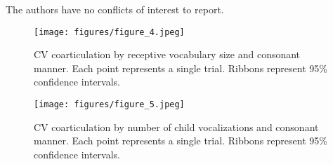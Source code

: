 \documentclass[a4paper,man,natbib,donotrepeattitle, apacite]{apa6}
\begin{document}
The authors have no conflicts of interest to report. 





\begin{figure}[H]
\centering
\texttt{[image: figures/figure\_4.jpeg]}
\caption{\label{fig:figure-4}CV coarticulation by receptive vocabulary size and consonant manner. Each point represents a single trial. Ribbons represent 95\% confidence intervals.}
\end{figure}

\begin{figure}[H]
\centering
\texttt{[image: figures/figure\_5.jpeg]}
\caption{\label{fig:figure-5}CV coarticulation by number of child vocalizations and consonant manner. Each point represents a single trial. Ribbons represent 95\% confidence intervals.}
\end{figure}
\end{document}
